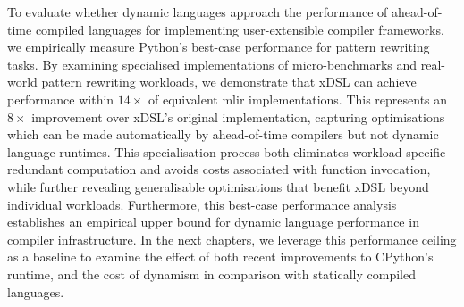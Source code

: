 To evaluate whether dynamic languages approach the performance of ahead-of-time compiled languages for implementing user-extensible compiler frameworks, we empirically measure Python's best-case performance for pattern rewriting tasks.
By examining specialised implementations of micro-benchmarks and real-world pattern rewriting workloads, we demonstrate that xDSL can achieve performance within $14\times$ of equivalent \ac{mlir} implementations. This represents an $8\times$ improvement over xDSL's original implementation, capturing optimisations which can be made automatically by ahead-of-time compilers but not dynamic language runtimes.
This specialisation process both eliminates workload-specific redundant computation and avoids costs associated with function invocation, while further revealing generalisable optimisations that benefit xDSL beyond individual workloads.
Furthermore, this best-case performance analysis establishes an empirical upper bound for dynamic language performance in compiler infrastructure.
In the next chapters, we leverage this performance ceiling as a baseline to examine the effect of both recent improvements to CPython's runtime, and the cost of dynamism in comparison with statically compiled languages.
